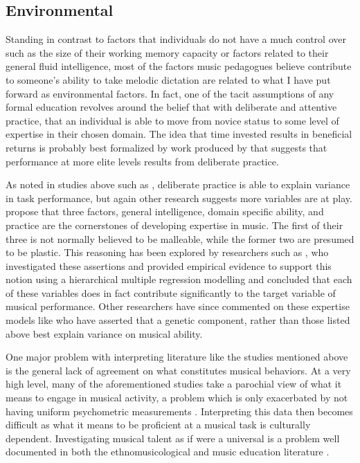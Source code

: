 \documentclass[]{book}
\begin{document}
\hypertarget{environmental}{%
\subsection{Environmental}\label{environmental}}

Standing in contrast to factors that individuals do not have a much control over such as the size of their working memory capacity or factors related to their general fluid intelligence, most of the factors music pedagogues believe contribute to someone's ability to take melodic dictation are related to what I have put forward as environmental factors.
In fact, one of the tacit assumptions of any formal education revolves around the belief that with deliberate and attentive practice, that an individual is able to move from novice status to some level of expertise in their chosen domain.
The idea that time invested results in beneficial returns is probably best formalized by work produced by \citet{ericssonRoleDeliberatePractice1993} that suggests that performance at more elite levels results from deliberate practice.

As noted in studies above such as \citet{meinzDeliberatePracticeNecessary2010}, deliberate practice is able to explain variance in task performance, but again other research suggests more variables are at play.
\citet{dettermanMoreComprehensiveTheory1999} propose that three factors, general intelligence, domain specific ability, and practice are the cornerstones of developing expertise in music.
The first of their three is not normally believed to be malleable, while the former two are presumed to be plastic.
This reasoning has been explored by researchers such as \citet{ruthsatzBecomingExpertMusical2008}, who investigated these assertions and provided empirical evidence to support this notion using a hierarchical multiple regression modelling and concluded that each of these variables does in fact contribute significantly to the target variable of musical performance.
Other researchers have since commented on these expertise models like \citet{mosingPracticeDoesNot2014} who have asserted that a genetic component, rather than those listed above best explain variance on musical ability.

One major problem with interpreting literature like the studies mentioned above is the general lack of agreement on what constitutes musical behaviors.
At a very high level, many of the aforementioned studies take a parochial view of what it means to engage in musical activity, a problem which is only exacerbated by not having uniform psychometric measurements \citep{bakerExaminingMusicalSophistication2018a, talaminiMusiciansHaveBetter2017}.
Interpreting this data then becomes difficult as what it means to be proficient at a musical task is culturally dependent.
Investigating musical talent as if were a universal is a problem well documented in both the ethnomusicological and music education literature \citep{blackingHowMusicalMan2000, murphyHowFarTests1999}.
\end{document}

